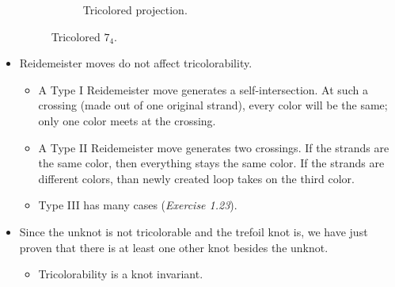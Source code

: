 \documentclass[titlepage]{article}
\numberwithin{figure}{section}
\numberwithin{table}{section}
\numberwithin{equation}{section}
\begin{document}
\begin{itemize}
\begin{figure}[h!]
\begin{subfigure}[b]{0.3\linewidth}
            \caption{Tricolored projection.}
            \label{fig:ex1-22b}
        \end{subfigure}
        \caption{Tricolored $7_4$.}
        \label{fig:ex1-22}
    \end{figure}
    \item Reidemeister moves do not affect tricolorability.
    \begin{itemize}
        \item A Type I Reidemeister move generates a self-intersection. At such a crossing (made out of one original strand), every color will be the same; only one color meets at the crossing.
        \item A Type II Reidemeister move generates two crossings. If the strands are the same color, then everything stays the same color. If the strands are different colors, than newly created loop takes on the third color.
        \item Type III has many cases (\emph{Exercise 1.23}).
    \end{itemize}
    \item Since the unknot is not tricolorable and the trefoil knot is, we have just proven that there is at least one other knot besides the unknot.
    \begin{itemize}
        \item Tricolorability is a knot invariant.

\end{itemize}
\end{itemize}
\end{document}
